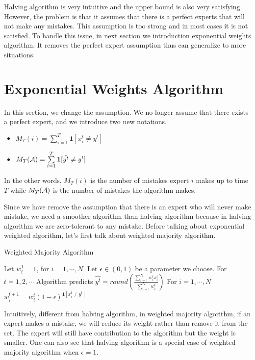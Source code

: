 \documentclass[../main.tex]{subfiles}
\begin{document}
Halving algorithm is very intuitive and the upper bound is also very satisfying. However, the problem is that it assumes that there is a perfect experts that will not make any mistakes. This assumption is too strong and in most cases it is not satisfied. To handle this issue, in next section we introduction exponential weights algorithm. It removes the perfect expert assumption thus can generalize to more situations.

\section{Exponential Weights Algorithm}

In this section, we change the assumption. We no longer assume that there exists a perfect expert, and we introduce two new notations.

\begin{itemize}
	\item $M_T(i) = \sum\limits_{i = 1}^T \mathbf{1}[x^t_i \neq y^t]$
	\item $M_T(\mathcal{A}) = \sum\limits_{i = 1}^T \mathbf{1}[\hat{y^t} \neq y^t]$
\end{itemize}

In the other words, $M_T(i)$ is the number of mistakes expert $i$ makes up to time $T$ while $M_T(\mathcal{A})$ is the number of mistakes the algorithm makes.

Since we have remove the assumption that there is an expert who will never make mistake, we need a smoother algorithm than halving algorithm because in halving algorithm we are zero-tolerant to any mistake. Before talking about exponential weighted algorithm, let's first talk about weighted majority algorithm.


\begin{algorithm}[H]
	\caption{Weighted Majority Algorithm}
	\begin{algorithmic}
		\STATE Let $w_i^1 = 1$, for $i = 1, \cdots, N$.
		\STATE Let $\epsilon \in (0,1)$ be a parameter we choose.
		\STATE For $t = 1,2,\cdots $
		\bindent
		\STATE Algorithm predicts $\hat{y^t} = round(\frac{\sum\limits_{i = 1}^N w_i^t x_i^t}{\sum\limits_{i = 1}^N w_i^t })$ 
		\STATE For $i = 1, \cdots, N$
		\bindentt
		\STATE $w_i^{t+1} = w_i^t (1- \epsilon)^{\mathbf{1}[x_i^t \neq y^t]}$
		\eindentt 
		\eindent
	\end{algorithmic}
\end{algorithm}

Intuitively, different from halving algorithm, in weighted majority algorithm, if an expert makes a mistake, we will reduce its weight rather than remove it from the set. The expert will still have contribution to the algorithm but the weight is smaller. One can also see that halving algorithm is a special case of weighted majority algorithm when $\epsilon = 1$.
\end{document}
